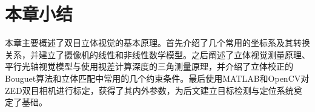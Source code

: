 \section{本章小结}
本章主要概述了双目立体视觉的基本原理。首先介绍了几个常用的坐标系及其转换关系，并建立了摄像机的线性和非线性数学模型。之后阐述了立体视觉测量原理、平行光轴视觉模型与使用视差计算深度的三角测量原理，并介绍了立体校正的Bouguet算法和立体匹配中常用的几个约束条件。最后使用MATLAB和OpenCV对ZED双目相机进行标定，获得了其内外参数，为后文建立目标检测与定位系统奠定了基础。









